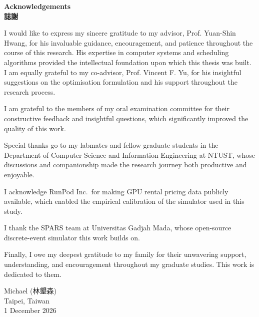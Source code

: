 \newpage
{}

\begin{center}
{\Huge \textbf{Acknowledgements}}\\[0.3em]
{\LARGE \textbf{誌謝}}
\end{center}

\vspace{20pt}

I would like to express my sincere gratitude to my advisor, Prof. Yuan-Shin Hwang, for his invaluable guidance, encouragement, and patience throughout the course of this research. His expertise in computer systems and scheduling algorithms provided the intellectual foundation upon which this thesis was built. I am equally grateful to my co-advisor, Prof. Vincent F. Yu, for his insightful suggestions on the optimisation formulation and his support throughout the research process.

I am grateful to the members of my oral examination committee for their constructive feedback and insightful questions, which significantly improved the quality of this work.

Special thanks go to my labmates and fellow graduate students in the Department of Computer Science and Information Engineering at NTUST, whose discussions and companionship made the research journey both productive and enjoyable.

I acknowledge RunPod Inc.\ for making GPU rental pricing data publicly available, which enabled the empirical calibration of the simulator used in this study.

I thank the SPARS team at Universitas Gadjah Mada, whose open-source discrete-event simulator this work builds on.

Finally, I owe my deepest gratitude to my family for their unwavering support, understanding, and encouragement throughout my graduate studies. This work is dedicated to them.

\vspace{1.5cm}
\begin{flushright}
Michael (林墾森)\\
Taipei, Taiwan\\
1 December 2026
\end{flushright}
